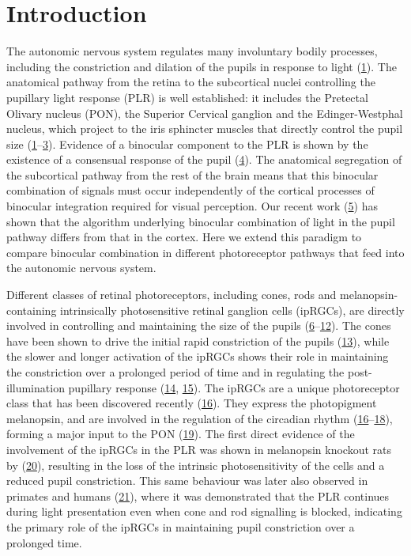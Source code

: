 \documentclass[
]{article}
\begin{document}
\hypertarget{introduction}{%
\section{Introduction}\label{introduction}}

The autonomic nervous system regulates many involuntary bodily processes, including the constriction and dilation of the pupils in response to light (\protect\hyperlink{ref-McDougal2015}{1}). The anatomical pathway from the retina to the subcortical nuclei controlling the pupillary light response (PLR) is well established: it includes the Pretectal Olivary nucleus (PON), the Superior Cervical ganglion and the Edinger-Westphal nucleus, which project to the iris sphincter muscles that directly control the pupil size (\protect\hyperlink{ref-McDougal2015}{1}--\protect\hyperlink{ref-Wang2015}{3}). Evidence of a binocular component to the PLR is shown by the existence of a consensual response of the pupil (\protect\hyperlink{ref-Wyatt1981}{4}). The anatomical segregation of the subcortical pathway from the rest of the brain means that this binocular combination of signals must occur independently of the cortical processes of binocular integration required for visual perception. Our recent work (\protect\hyperlink{ref-Segala2023}{5}) has shown that the algorithm underlying binocular combination of light in the pupil pathway differs from that in the cortex. Here we extend this paradigm to compare binocular combination in different photoreceptor pathways that feed into the autonomic nervous system.

Different classes of retinal photoreceptors, including cones, rods and melanopsin-containing intrinsically photosensitive retinal ganglion cells (ipRGCs), are directly involved in controlling and maintaining the size of the pupils (\protect\hyperlink{ref-Barrionuevo2014}{6}--\protect\hyperlink{ref-Woelders2018}{12}). The cones have been shown to drive the initial rapid constriction of the pupils (\protect\hyperlink{ref-Mathot2018}{13}), while the slower and longer activation of the ipRGCs shows their role in maintaining the constriction over a prolonged period of time and in regulating the post-illumination pupillary response (\protect\hyperlink{ref-Markwell2010}{14}, \protect\hyperlink{ref-McDougal2010}{15}). The ipRGCs are a unique photoreceptor class that has been discovered recently (\protect\hyperlink{ref-Provencio2000}{16}). They express the photopigment melanopsin, and are involved in the regulation of the circadian rhythm (\protect\hyperlink{ref-Provencio2000}{16}--\protect\hyperlink{ref-Ruby2002}{18}), forming a major input to the PON (\protect\hyperlink{ref-Dacey2003}{19}). The first direct evidence of the involvement of the ipRGCs in the PLR was shown in melanopsin knockout rats by (\protect\hyperlink{ref-Lucas2003}{20}), resulting in the loss of the intrinsic photosensitivity of the cells and a reduced pupil constriction. This same behaviour was later also observed in primates and humans (\protect\hyperlink{ref-Gamlin2007}{21}), where it was demonstrated that the PLR continues during light presentation even when cone and rod signalling is blocked, indicating the primary role of the ipRGCs in maintaining pupil constriction over a prolonged time.
\end{document}
